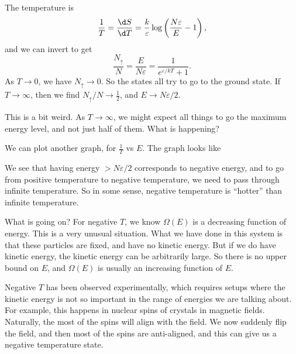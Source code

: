 \documentclass[a4paper]{article}
\begin{document}
\begin{eg}
\begin{center}
  \end{center}%
  The temperature is
  \[
    \frac{1}{T} = \frac{\d S}{\d T} = \frac{k}{\varepsilon} \log \left(\frac{N \varepsilon}{E} - 1\right),
  \]
  and we can invert to get
  \[
    \frac{N_{\uparrow}}{N} = \frac{E}{N\varepsilon} = \frac{1}{e^{\varepsilon /kT} + 1}.
  \]
  As $T \to 0$, we have $N_\uparrow \to 0$. So the states all try to go to the ground state. If $T \to \infty$, then we find $N_\uparrow/N \to \frac{1}{2}$, and $E \to N\varepsilon/2$.

  This is a bit weird. As $T \to \infty$, we might expect all things to go the maximum energy level, and not just half of them. What is happening?

  We can plot another graph, for $\frac{1}{T}$ vs $E$. The graph looks like
  \begin{center}
  \end{center}
  We see that having energy $> N\varepsilon/2$ corresponds to negative energy, and to go from positive temperature to negative temperature, we need to pass through infinite temperature. So in some sense, negative temperature is ``hotter'' than infinite temperature.

  What is going on? For negative $T$, we know $\Omega(E)$ is a decreasing function of energy. This is a very unusual situation. What we have done in this system is that these particles are fixed, and have no kinetic energy. But if we do have kinetic energy, the kinetic energy can be arbitrarily large. So there is no upper bound on $E$, and $\Omega(E)$ is usually an increasing function of $E$.

  Negative $T$ has been observed experimentally, which requires setups where the kinetic energy is not so important in the range of energies we are talking about. For example, this happens in nuclear spins of crystals in magnetic fields. Naturally, the most of the spins will align with the field. We now suddenly flip the field, and then most of the spins are anti-aligned, and this can give us a negative temperature state.


\end{eg}
\end{document}
